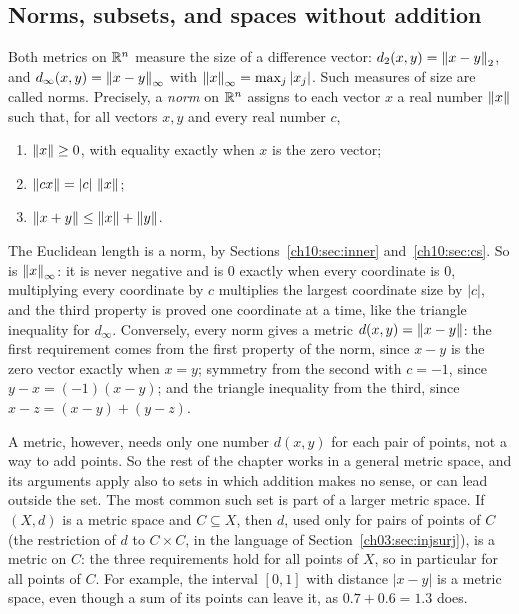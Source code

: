 \subsection*{Norms, subsets, and spaces without addition}
Both metrics on $\mathbb R^n$ measure the size of a difference vector: $d_2(x,y)=\left\|x-y\right\|_2$, and $d_\infty(x,y)=\left\|x-y\right\|_\infty$ with $\left\|x\right\|_\infty=\max_j|x_j|$. Such measures of size are called norms. Precisely, a \emph{norm} on $\mathbb R^n$ assigns to each vector $x$ a real number $\left\|x\right\|$ such that, for all vectors $x,y$ and every real number $c$,
\begin{enumerate}
\item $\left\|x\right\|\ge0$, with equality exactly when $x$ is the zero vector;
\item $\left\|cx\right\|=|c|\,\left\|x\right\|$;
\item $\left\|x+y\right\|\le\left\|x\right\|+\left\|y\right\|$.
\end{enumerate}
The Euclidean length is a norm, by Sections~\ref{ch10:sec:inner} and~\ref{ch10:sec:cs}. So is $\left\|x\right\|_\infty$: it is never negative and is $0$ exactly when every coordinate is $0$, multiplying every coordinate by $c$ multiplies the largest coordinate size by $|c|$, and the third property is proved one coordinate at a time, like the triangle inequality for $d_\infty$. Conversely, every norm gives a metric $d(x,y)=\left\|x-y\right\|$: the first requirement comes from the first property of the norm, since $x-y$ is the zero vector exactly when $x=y$; symmetry from the second with $c=-1$, since $y-x=(-1)(x-y)$; and the triangle inequality from the third, since $x-z=(x-y)+(y-z)$.

A metric, however, needs only one number $d(x,y)$ for each pair of points, not a way to add points. So the rest of the chapter works in a general metric space, and its arguments apply also to sets in which addition makes no sense, or can lead outside the set. The most common such set is part of a larger metric space. If $(X,d)$ is a metric space and $C\subseteq X$, then $d$, used only for pairs of points of $C$ (the restriction of $d$ to $C\times C$, in the language of Section~\ref{ch03:sec:injsurj}), is a metric on $C$: the three requirements hold for all points of $X$, so in particular for all points of $C$. For example, the interval $[0,1]$ with distance $|x-y|$ is a metric space, even though a sum of its points can leave it, as $0.7+0.6=1.3$ does.

